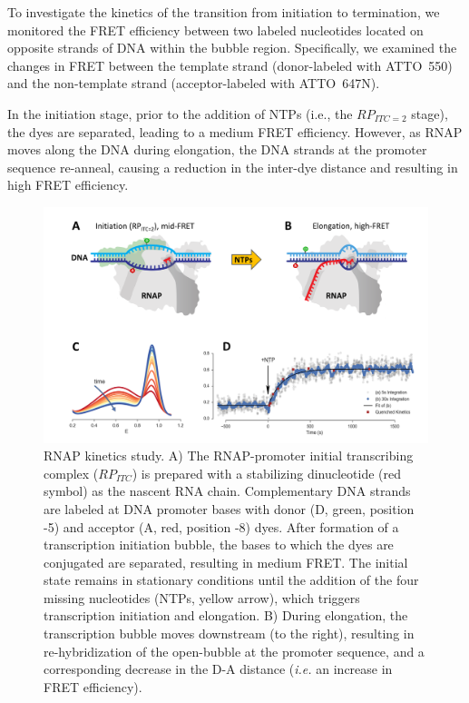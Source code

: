 To investigate the kinetics of the transition from initiation to termination, we monitored the FRET efficiency between two labeled nucleotides located on opposite strands of DNA within the bubble region. 
Specifically, we examined the changes in FRET between the template strand (donor-labeled with ATTO~550) and the non-template strand (acceptor-labeled with ATTO~647N).

In the initiation stage, prior to the addition of \ac{NTP}s (i.e., the $RP_{ITC=2}$ stage), the dyes are separated, leading to a medium FRET efficiency. 
However, as \ac{RNAP} moves along the DNA during elongation, the DNA strands at the promoter sequence re-anneal, causing a reduction in the inter-dye distance and resulting in high FRET efficiency.

\begin{figure}
\centering\includegraphics[width=\textwidth]{chapters/figures/RNAP_kinetics.png}
\caption{\label{fig:RNAP_kinetics} 
RNAP kinetics study.
A) The RNAP-promoter initial transcribing complex ($RP_{ITC}$) is prepared with a stabilizing dinucleotide (red symbol) as the nascent RNA chain.
Complementary DNA strands are labeled at DNA promoter bases with donor (D, green, position -5) and acceptor (A, red, position -8) dyes. 
After formation of a transcription initiation bubble, the bases to which the dyes are conjugated
are separated, resulting in medium FRET. 
The initial state remains in stationary conditions until the addition of the four missing nucleotides (\ac{NTP}s, yellow arrow), which triggers transcription initiation and elongation. 
B) During elongation, the transcription bubble moves downstream (to the right), resulting in re-hybridization of the open-bubble at the promoter sequence, and a corresponding decrease in the D-A distance (\textit{i.e.} an increase in FRET efficiency).
}
\end{figure}
